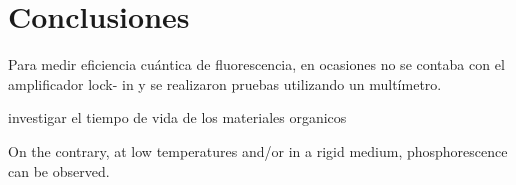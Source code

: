 \chapter{Conclusiones}   %



Para medir eficiencia cu\'antica de fluorescencia, en ocasiones no se contaba con el amplificador lock- in y se realizaron pruebas utilizando un mult\'imetro.




investigar el tiempo de vida de los materiales organicos


On the contrary, at low temperatures and/or in a rigid medium, phosphorescence
can be observed.